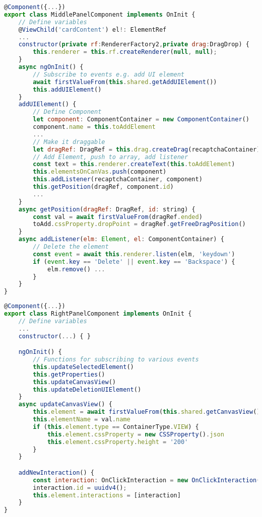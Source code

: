 \begin{lstlisting}[language=JavaScript, caption=middle-panel.component.ts, label=listing:implementation:middle]
@Component({...})
export class MiddlePanelComponent implements OnInit {
    // Define variables
    @ViewChild('cardContent') el!: ElementRef
    ...
    constructor(private rf:RendererFactory2,private drag:DragDrop) {
        this.renderer = this.rf.createRenderer(null, null);
    }
    async ngOnInit() {
        // Subscribe to events e.g. add UI element
        await firstValueFrom(this.shared.getAddUIElement())
        this.addUIElement()
    }
    addUIElement() {
        // Define Component
        let component: ComponentContainer = new ComponentContainer()
        component.name = this.toAddElement
        ...
        // Make it draggable
        let dragRef: DragRef = this.drag.createDrag(recaptchaContainer).withBoundaryElement(this.el)
        // Add Element, push to array, add listener
        const text = this.renderer.createText(this.toAddElement)
        this.elementsOnCanVas.push(component)
        this.addListener(recaptchaContainer, component)
        this.getPosition(dragRef, component.id)
        ...
    }
    async getPosition(dragRef: DragRef, id: string) {
        const val = await firstValueFrom(dragRef.ended)
        toAdd.cssProperty.dropPoint = dragRef.getFreeDragPosition()
    }
    async addListener(elm: Element, el: ComponentContainer) {
        // Delete the element 
        const event = await this.renderer.listen(elm, 'keydown')
        if (event.key == 'Delete' || event.key == 'Backspace') {
            elm.remove() ...
        }
    }
}
\end{lstlisting}

\begin{lstlisting}[language=JavaScript, caption=right-panel.component.ts, label=listing:implementation:right]
@Component({...})
export class RightPanelComponent implements OnInit {
    // Define variables
    ...
    constructor(...) { }

    ngOnInit() {
        // Functions for subscribing to various events
        this.updateSelectedElement()
        this.getProperties()
        this.updateCanvasView()
        this.updateDeletionUIElement()
    }
    async updateCanvasView() {
        this.element = await firstValueFrom(this.shared.getCanvasView())
        this.elementName = val.name
        if (this.element.type == ContainerType.VIEW) {
            this.element.cssProperty = new CSSProperty().json
            this.element.cssProperty.height = '200'
        }
    }

    addNewInteraction() {
        const interaction: OnClickInteraction = new OnClickInteraction();
        interaction.id = uuidv4();
        this.element.interactions = [interaction]
    }
}    
\end{lstlisting}

